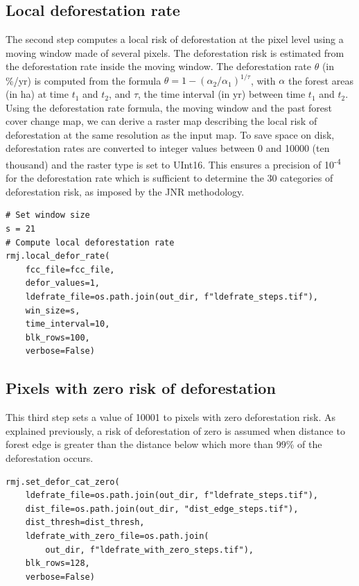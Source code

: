 \documentclass[paper=a4, 12pt, DIV=12]{scrartcl}
\begin{document}
\subsection{Local deforestation rate}
\label{sec:org4b2cf4c}

The second step computes a local risk of deforestation at the pixel level using a moving window made of several pixels. The deforestation risk is estimated from the deforestation rate inside the moving window. The deforestation rate \(\theta\) (in \%/yr) is computed from the formula \(\theta=1-(\alpha_2/\alpha_1)^{1/\tau}\), with \(\alpha\) the forest areas (in ha) at time \(t_1\) and \(t_2\), and \(\tau\), the time interval (in yr) between time \(t_1\) and \(t_2\). Using the deforestation rate formula, the moving window and the past forest cover change map, we can derive a raster map describing the local risk of deforestation at the same resolution as the input map. To save space on disk, deforestation rates are converted to integer values between 0 and 10000 (ten thousand) and the raster type is set to UInt16. This ensures a precision of 10\textsuperscript{-4} for the deforestation rate which is sufficient to determine the 30 categories of deforestation risk, as imposed by the JNR methodology.

\begin{verbatim}
# Set window size
s = 21
# Compute local deforestation rate
rmj.local_defor_rate(
    fcc_file=fcc_file,
    defor_values=1,
    ldefrate_file=os.path.join(out_dir, f"ldefrate_steps.tif"),
    win_size=s,
    time_interval=10,
    blk_rows=100,
    verbose=False)
\end{verbatim}

\subsection{Pixels with zero risk of deforestation}
\label{sec:org25d8836}

This third step sets a value of 10001 to pixels with zero deforestation risk. As explained previously, a risk of deforestation of zero is assumed when distance to forest edge is greater than the distance below which more than 99\% of the deforestation occurs.

\begin{verbatim}
rmj.set_defor_cat_zero(
    ldefrate_file=os.path.join(out_dir, f"ldefrate_steps.tif"),
    dist_file=os.path.join(out_dir, "dist_edge_steps.tif"),
    dist_thresh=dist_thresh,
    ldefrate_with_zero_file=os.path.join(
        out_dir, f"ldefrate_with_zero_steps.tif"),
    blk_rows=128,
    verbose=False)
\end{verbatim}
\end{document}
